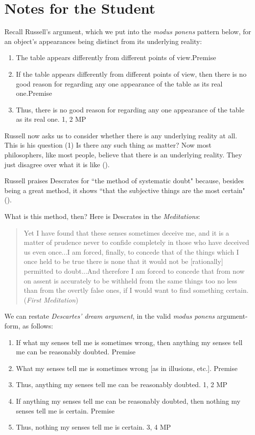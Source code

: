 \documentclass[oneside,letterpaper,12pt]{book}
\begin{document}
\section{Notes for the Student}
\par Recall Russell's argument, which we put into the \emph{modus ponens} pattern below, for an object's appearances being distinct from its underlying reality:
\begin{enumerate}
	\item The table appears differently from different points of view.\hfill Premise
	\item If the table appears differently from different points of view, then there is no good reason for regarding any one appearance of the table as its real one.\hfill Premise
	\item Thus, there is no good reason for regarding any one appearance of the table as its real one. \hfill 1, 2 MP
\end{enumerate}
Russell now asks us to consider whether there is any underlying reality at all. This is his question (1) Is there any such thing as matter? Now most philosophers, like most people, believe that there is an underlying reality. They just disagree over what it is like (\pageref{Q1}).
\par Russell praises Descrates for ``the method of systematic doubt" because, besides being a great method, it shows ``that the subjective things are the most certain" (\pageref{doubt}).
\par What is this method, then? Here is Descrates in the \textit{Meditations}:
\begin{quote}
	Yet I have found that these senses sometimes deceive me, and it is a matter of prudence never to confide completely in those who have deceived us even once...I am forced, finally, to concede that of the things which I once held to be true there is none that it would not be [rationally] permitted to doubt...And therefore I am forced to concede that from now on assent is accurately to be withheld from the same things too no less than from the overtly false ones, if I would want to find something certain. (\textit{First Meditation})
\end{quote}
We can restate \emph{Descartes' dream argument}, in the valid \textit{modus ponens} argument-form, as follows:
\begin{enumerate}
	\item If what my senses tell me is sometimes wrong, then anything my senses tell me can be reasonably doubted. \hfill Premise
	\item What my senses tell me is sometimes wrong [as in illusions, etc.]. \hfill Premise
	\item Thus, anything my senses tell me can be reasonably doubted. \hfill 1, 2 MP
	\item If anything my senses tell me can be reasonably doubted, then nothing my senses tell me is certain. \hfill Premise
	\item Thus, nothing my senses tell me is certain. \hfill 3, 4 MP
\end{enumerate}
\end{document}
